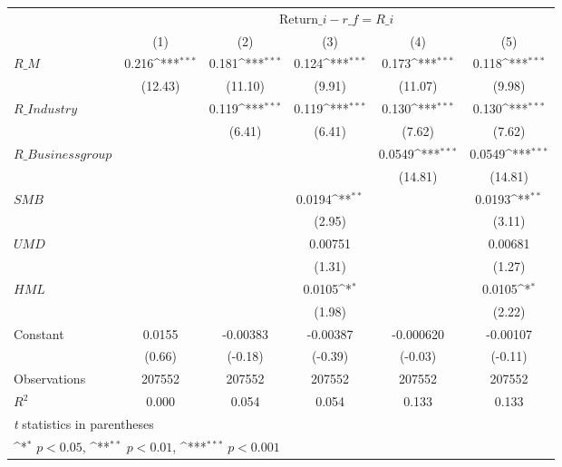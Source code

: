 {
\def\sym#1{\ifmmode^{#1}\else\(^{#1}\)\fi}
\begin{tabular}{l*{5}{c}}
\hline\hline
                &\multicolumn{5}{c}{ $ \text{Return}\_i - r\_f = R\_i$ }                                          \\\cmidrule(lr){2-6}
                &\multicolumn{1}{c}{(1)}         &\multicolumn{1}{c}{(2)}         &\multicolumn{1}{c}{(3)}         &\multicolumn{1}{c}{(4)}         &\multicolumn{1}{c}{(5)}         \\
\hline
 $ R\_M $        &    0.216\sym{***}&    0.181\sym{***}&    0.124\sym{***}&    0.173\sym{***}&    0.118\sym{***}\\
                &  (12.43)         &  (11.10)         &   (9.91)         &  (11.07)         &   (9.98)         \\
[1em]
 $ R\_{Industry} $ &                  &    0.119\sym{***}&    0.119\sym{***}&    0.130\sym{***}&    0.130\sym{***}\\
                &                  &   (6.41)         &   (6.41)         &   (7.62)         &   (7.62)         \\
[1em]
 $ R\_{Business group} $ &                  &                  &                  &   0.0549\sym{***}&   0.0549\sym{***}\\
                &                  &                  &                  &  (14.81)         &  (14.81)         \\
[1em]
 $ SMB $        &                  &                  &   0.0194\sym{**} &                  &   0.0193\sym{**} \\
                &                  &                  &   (2.95)         &                  &   (3.11)         \\
[1em]
 $ UMD $        &                  &                  &  0.00751         &                  &  0.00681         \\
                &                  &                  &   (1.31)         &                  &   (1.27)         \\
[1em]
 $ HML $        &                  &                  &   0.0105\sym{*}  &                  &   0.0105\sym{*}  \\
                &                  &                  &   (1.98)         &                  &   (2.22)         \\
[1em]
Constant        &   0.0155         & -0.00383         & -0.00387         &-0.000620         & -0.00107         \\
                &   (0.66)         &  (-0.18)         &  (-0.39)         &  (-0.03)         &  (-0.11)         \\
\hline
Observations    &   207552         &   207552         &   207552         &   207552         &   207552         \\
\(R^{2}\)       &    0.000         &    0.054         &    0.054         &    0.133         &    0.133         \\
\hline\hline
\multicolumn{6}{l}{\footnotesize \textit{t} statistics in parentheses}\\
\multicolumn{6}{l}{\footnotesize \sym{*} \(p<0.05\), \sym{**} \(p<0.01\), \sym{***} \(p<0.001\)}\\
\end{tabular}
}
